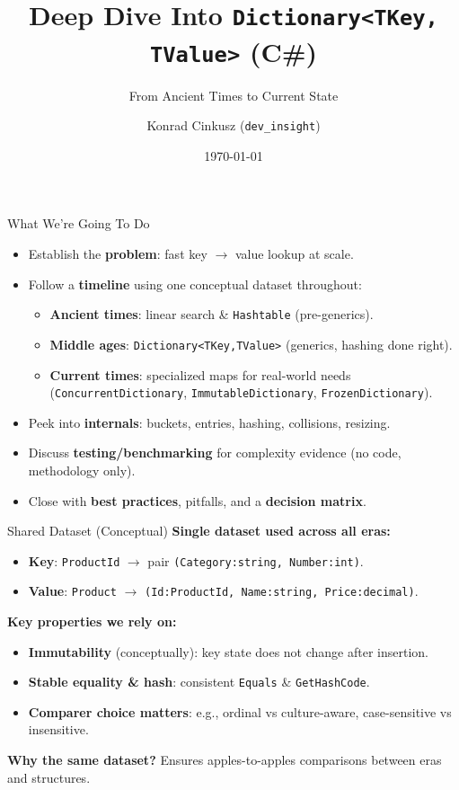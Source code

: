\documentclass[aspectratio=169]{beamer}
\title[Deep Dive: Dictionary<TKey,TValue>]{Deep Dive Into \texttt{Dictionary\textless TKey, TValue\textgreater} (C\#)}
\subtitle{From Ancient Times to Current State}
\author[\href{https://github.com/konradcinkusz}{dev\_insight \,|\, github.com/konradcinkusz}]{Konrad Cinkusz (\texttt{dev\_insight})}
\institute{C\# Collections Series}
\date{\today}
\newcommand{\code}[1]{\texttt{#1}}
\begin{document}
\begin{frame}
  \titlepage
\end{frame}

\begin{frame}{What We’re Going To Do}
  \begin{itemize}
    \item Establish the \textbf{problem}: fast key $\rightarrow$ value lookup at scale.
    \item Follow a \textbf{timeline} using one conceptual dataset throughout:
      \begin{itemize}
        \item \textbf{Ancient times}: linear search \& \code{Hashtable} (pre-generics).
        \item \textbf{Middle ages}: \code{Dictionary<TKey,TValue>} (generics, hashing done right).
        \item \textbf{Current times}: specialized maps for real-world needs
              (\code{ConcurrentDictionary}, \code{ImmutableDictionary}, \code{FrozenDictionary}).
      \end{itemize}
    \item Peek into \textbf{internals}: buckets, entries, hashing, collisions, resizing.
    \item Discuss \textbf{testing/benchmarking} for complexity evidence (no code, methodology only).
    \item Close with \textbf{best practices}, pitfalls, and a \textbf{decision matrix}.
  \end{itemize}
\end{frame}

\begin{frame}{Shared Dataset (Conceptual)}
  \textbf{Single dataset used across all eras:}
  \begin{itemize}
    \item \textbf{Key}: \code{ProductId} $\rightarrow$ pair \code{(Category:string, Number:int)}.
    \item \textbf{Value}: \code{Product} $\rightarrow$ \code{(Id:ProductId, Name:string, Price:decimal)}.
  \end{itemize}
  \textbf{Key properties we rely on:}
  \begin{itemize}
    \item \textbf{Immutability} (conceptually): key state does not change after insertion.
    \item \textbf{Stable equality \& hash}: consistent \code{Equals} \& \code{GetHashCode}.
    \item \textbf{Comparer choice matters}: e.g., ordinal vs culture-aware, case-sensitive vs insensitive.
  \end{itemize}
  \textbf{Why the same dataset?} Ensures apples-to-apples comparisons between eras and structures.
\end{frame}
\end{document}
